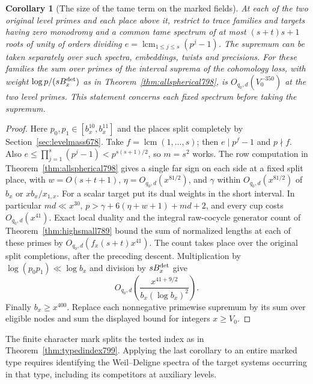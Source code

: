 \documentclass[a4paper,11pt]{article}
\newtheorem{corollary}[proposition]{Corollary}
\theoremstyle{definition}
\theoremstyle{remark}
\numberwithin{equation}{section}
\begin{document}
\begin{corollary}[The size of the tame term on the marked fields]
\leavevmode\label{cor:tamebudget800}
At each of the two original level primes and each place
above it, restrict to trace families and targets having
zero monodromy and a common tame spectrum of at most
\((s+t)s+1\) roots of unity of orders dividing
\(e=\operatorname{lcm}_{1\le j\le s}(p^j-1)\).
The supremum can be taken separately over such spectra,
embeddings, twists and precisions. For these families the
sum over primes of the interval suprema of the cohomology
loss, with weight \(\log p/(sB_x^{\rm det})\) as in
Theorem~\ref{thm:allspherical798}, is \(O_{q_0,d}(V_0^{-350})\)
at the two level primes. This statement concerns each
fixed spectrum before taking the supremum.
\end{corollary}
\begin{proof}
Here \(p_0,p_1\in[b_x^{10},b_x^{11}]\) and the places
split completely by Section~\ref{sec:levelmass678}.
Take \(f=\operatorname{lcm}(1,\ldots,s)\); then \(e\mid p^f-1\)
and \(p\nmid f\). Also \(e\le\prod_{j=1}^s(p^j-1)
<p^{s(s+1)/2}\), so \(m=s^2\) works.
The row computation in Theorem~\ref{thm:allspherical798}
gives a single far sign on each side at a fixed split
place, with \(w=O(s+t+1)\), \(\eta=O_{q_0,d}(x^{81/2})\),
and \(\gamma\) within \(O_{q_0,d}(x^{81/2})\) of
\(b_x\) or \(xb_x/x_{1,x}\). For a scalar target put its
dual weights in the short interval. In particular
\(md\ll x^{30}\), \(p>\gamma+6(\eta+w+1)+md+2\), and
every cup costs \(O_{q_0,d}(x^{41})\).
Exact local duality and the integral raw-cocycle generator
count of Theorem~\ref{thm:highsmall789} bound the sum of
normalized lengths at each of these primes by
\(O_{q_0,d}(f_x(s+t)x^{41})\). The count takes place over
the original split completions, after the preceding descent.
Multiplication by \(\log(p_0p_1)\ll\log b_x\) and division
by \(sB_x^{\rm det}\) give
\[
              O_{q_0,d}\!\left(
                  \frac{x^{41+9/2}}{b_x(\log b_x)^2}
                          \right).
\]
Finally \(b_x\ge x^{400}\). Replace each nonnegative
primewise supremum by its sum over eligible nodes and sum
the displayed bound for integers \(x\ge V_0\).
\end{proof}
The finite character mark splits the tested index as in
Theorem~\ref{thm:typedindex799}. Applying the last corollary
to an entire marked type requires identifying the
Weil--Deligne spectra of the target systems occurring in
that type, including its competitors at auxiliary levels.
\clearpage
\end{document}
